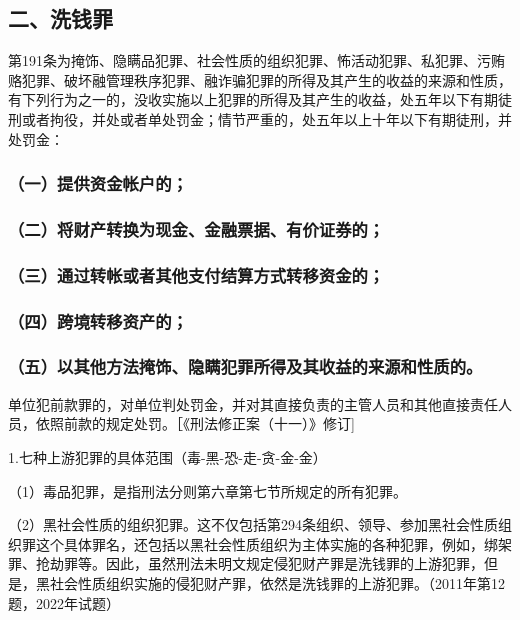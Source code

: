 
\subsection*{二、洗钱罪}

第191条为掩饰、隐瞒品犯罪、社会性质的组织犯罪、怖活动犯罪、私犯罪、污贿赂犯罪、破坏融管理秩序犯罪、融诈骗犯罪的所得及其产生的收益的来源和性质，有下列行为之一的，没收实施以上犯罪的所得及其产生的收益，处五年以下有期徒刑或者拘役，并处或者单处罚金；情节严重的，处五年以上十年以下有期徒刑，并处罚金：

\subsubsection*{（一）提供资金帐户的；}

\subsubsection*{（二）将财产转换为现金、金融票据、有价证券的；}

\subsubsection*{（三）通过转帐或者其他支付结算方式转移资金的；}

\subsubsection*{（四）跨境转移资产的；}

\subsubsection*{（五）以其他方法掩饰、隐瞒犯罪所得及其收益的来源和性质的。}

单位犯前款罪的，对单位判处罚金，并对其直接负责的主管人员和其他直接责任人员，依照前款的规定处罚。［《刑法修正案（十一）》修订]

1.七种上游犯罪的具体范围（毒-黑-恐-走-贪-金-金）

（1）毒品犯罪，是指刑法分则第六章第七节所规定的所有犯罪。

（2）黑社会性质的组织犯罪。这不仅包括第294条组织、领导、参加黑社会性质组织罪这个具体罪名，还包括以黑社会性质组织为主体实施的各种犯罪，例如，绑架罪、抢劫罪等。因此，虽然刑法未明文规定侵犯财产罪是洗钱罪的上游犯罪，但是，黑社会性质组织实施的侵犯财产罪，依然是洗钱罪的上游犯罪。（2011年第12题，2022年试题）

